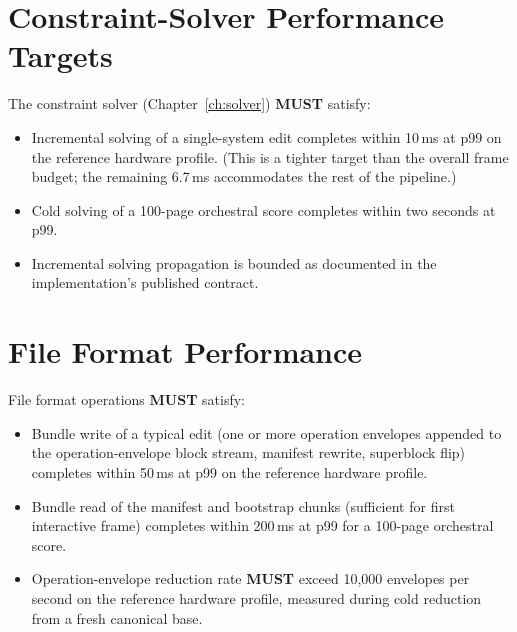 \documentclass[11pt,letterpaper]{report}
\newcounter{requirement}[chapter]
\newcommand{\MUST}{\textbf{MUST}}
\begin{document}
\section{Constraint-Solver Performance Targets}
\label{sec:perf:solver}

\begin{requirement}
  \label{req:perf:solver-latency}
  The constraint solver (Chapter~\ref{ch:solver}) \MUST{} satisfy:

  \begin{itemize}
    \item Incremental solving of a single-system edit completes
      within 10\,ms at p99 on the reference hardware profile.
      (This is a tighter target than the overall frame budget; the
      remaining 6.7\,ms accommodates the rest of the pipeline.)
    \item Cold solving of a 100-page orchestral score completes
      within two seconds at p99.
    \item Incremental solving propagation is bounded as documented
      in the implementation's published contract.
  \end{itemize}
\end{requirement}

\section{File Format Performance}
\label{sec:perf:format}

\begin{requirement}
  \label{req:perf:file-operation-latency}
  File format operations \MUST{} satisfy:

  \begin{itemize}
    \item Bundle write of a typical edit (one or more operation
      envelopes appended to the operation-envelope block stream,
      manifest rewrite, superblock flip) completes within
      50\,ms at p99 on the reference hardware profile.
    \item Bundle read of the manifest and bootstrap chunks
      (sufficient for first interactive frame) completes within
      200\,ms at p99 for a 100-page orchestral score.
    \item Operation-envelope reduction rate \MUST{} exceed
      10{,}000 envelopes per second on the reference hardware
      profile, measured during cold reduction from a fresh
      canonical base.
  \end{itemize}
\end{requirement}
\end{document}
